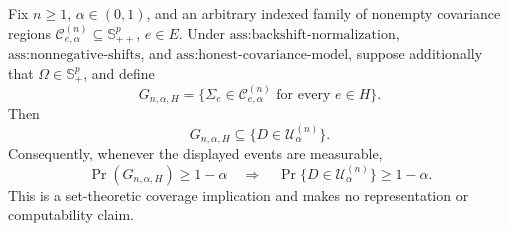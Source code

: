 Fix \(n\geq1\), \(\alpha\in(0,1)\), and an arbitrary indexed family of nonempty covariance regions \(\mathcal C^{(n)}_{e,\alpha}\subseteq\mathbb S_{++}^{p}\), \(e\in E\). Under \(\text{ass:backshift-normalization}\), \(\text{ass:nonnegative-shifts}\), and \(\text{ass:honest-covariance-model}\), suppose additionally that \(\Omega\in\mathbb S_+^p\), and define
\[
G_{n,\alpha,H}
=\{\Sigma_e\in\mathcal C^{(n)}_{e,\alpha}\text{ for every }e\in H\}.
\]
Then
\[
G_{n,\alpha,H}\subseteq\{D\in\mathcal U^{(n)}_\alpha\}.
\]
Consequently, whenever the displayed events are measurable,
\[
\Pr(G_{n,\alpha,H})\geq1-\alpha
\quad\Longrightarrow\quad
\Pr\{D\in\mathcal U^{(n)}_\alpha\}\geq1-\alpha.
\]
This is a set-theoretic coverage implication and makes no representation or computability claim.
